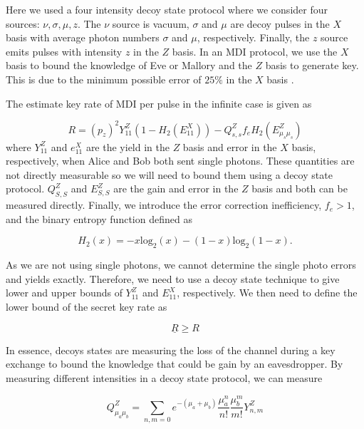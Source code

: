 Here we used a four intensity decoy state protocol where we consider four sources: $\nu, \sigma, \mu, z$. The $\nu$ source is vacuum, $\sigma$ and $\mu$ are decoy pulses in the $X$ basis with average photon numbers $\sigma$ and $\mu$, respectively. Finally, the $z$ source emits pulses with intensity $z$ in the $Z$ basis. In an \ac{MDI} protocol, we use the $X$ basis to bound the knowledge of Eve or Mallory and the $Z$ basis to generate key. This is due to the minimum possible error of $25\%$ in the $X$ basis \cite{Rubenok2013}.

The estimate key rate of \ac{MDI} per pulse in the infinite case is given as

\begin{equation}
	R = (p_z)^2 Y_{11}^Z \left(1 - H_2(E_{11}^X)\right) - Q_{s,s}^Z f_e H_2(E_{\mu_s\mu_s}^Z)
\end{equation}
where $Y_{11}^Z$ and $e_{11}^X$ are the yield in the $Z$ basis and error in the $X$ basis, respectively, when Alice and Bob both sent single photons. These quantities are not directly measurable so we will need to bound them using a decoy state protocol. $Q_{S,S}^Z$ and $E_{S,S}^Z$ are the gain and error in the $Z$ basis and both can be measured directly. Finally, we introduce the error correction inefficiency, $f_e>1$, and the binary entropy function defined as

\begin{equation}
	H_2(x) = -x \mathrm{log}_2(x) - (1-x) \mathrm{log}_2(1-x).
\end{equation}

As we are not using single photons, we cannot determine the single photo errors and yields exactly. Therefore, we need to use a decoy state technique \cite{Lo2005} to give lower and upper bounds of $Y_{11}^Z$ and $E_{11}^X$, respectively. We then need to define the lower bound of the secret key rate as

\begin{equation}
	\underline{R} \geq R
\end{equation}

In essence, decoys states are measuring the loss of the channel during a key exchange to bound the knowledge that could be gain by an eavesdropper.  By measuring different intensities in a decoy state protocol, we can measure

\begin{equation}
	Q_{\mu_a \mu_b}^Z = \sum_{n,m=0} e^{-(\mu_a + \mu_b)}\frac{\mu_a^n}{n!}\frac{\mu_b^m}{m!} Y_{n,m}^Z
\end{equation}

